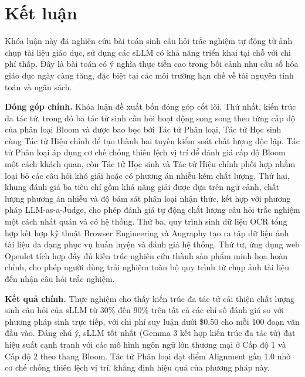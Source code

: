 \chapter*{Kết luận}

Khóa luận này đã nghiên cứu bài toán sinh câu hỏi trắc nghiệm tự động từ ảnh chụp tài liệu giáo dục, sử dụng các sLLM có khả năng triển khai tại chỗ với chi phí thấp. Đây là bài toán có ý nghĩa thực tiễn cao trong bối cảnh nhu cầu số hóa giáo dục ngày càng tăng, đặc biệt tại các môi trường hạn chế về tài nguyên tính toán và ngân sách.

\textbf{Đóng góp chính.} Khóa luận đề xuất bốn đóng góp cốt lõi. Thứ nhất, kiến trúc đa tác tử, trong đó ba tác tử sinh câu hỏi hoạt động song song theo từng cấp độ của phân loại Bloom và được bao bọc bởi Tác tử Phân loại, Tác tử Học sinh cùng Tác tử Hiệu chỉnh để tạo thành hai tuyến kiểm soát chất lượng độc lập. Tác tử Phân loại áp dụng cơ chế chống thiên lệch vị trí để đánh giá cấp độ Bloom một cách khách quan, còn Tác tử Học sinh và Tác tử Hiệu chỉnh phối hợp nhằm loại bỏ các câu hỏi khó giải hoặc có phương án nhiễu kém chất lượng. Thứ hai, khung đánh giá ba tiêu chí gồm khả năng giải được dựa trên ngữ cảnh, chất lượng phương án nhiễu và độ bám sát phân loại nhận thức, kết hợp với phương pháp LLM-as-a-Judge, cho phép đánh giá tự động chất lượng câu hỏi trắc nghiệm một cách nhất quán và có hệ thống. Thứ ba, quy trình sinh dữ liệu OCR tổng hợp kết hợp kỹ thuật Browser Engineering và Augraphy tạo ra tập dữ liệu ảnh tài liệu đa dạng phục vụ huấn luyện và đánh giá hệ thống. Thứ tư, ứng dụng web Openlet tích hợp đầy đủ kiến trúc nghiên cứu thành sản phẩm minh họa hoàn chỉnh, cho phép người dùng trải nghiệm toàn bộ quy trình từ chụp ảnh tài liệu đến nhận câu hỏi trắc nghiệm.

\textbf{Kết quả chính.} Thực nghiệm cho thấy kiến trúc đa tác tử cải thiện chất lượng sinh câu hỏi của sLLM từ 30\% đến 90\% trên tất cả các chỉ số đánh giá so với phương pháp sinh trực tiếp, với chi phí suy luận dưới \$0.50 cho mỗi 100 đoạn văn đầu vào. Đáng chú ý, sLLM tốt nhất (Gemma 3 kết hợp kiến trúc đa tác tử) đạt hiệu suất cạnh tranh với các mô hình ngôn ngữ lớn thương mại ở Cấp độ 1 và Cấp độ 2 theo thang Bloom. Tác tử Phân loại đạt điểm Alignment gần 1.0 nhờ cơ chế chống thiên lệch vị trí, khẳng định hiệu quả của phương pháp này.

